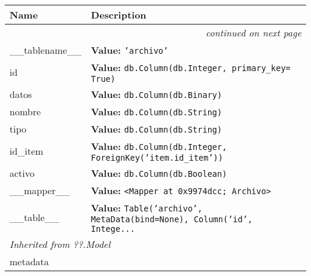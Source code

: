     \vspace{-1cm}
\hspace{\varindent}\begin{longtable}{|p{\varnamewidth}|p{\vardescrwidth}|l}
\cline{1-2}
\cline{1-2} \centering \textbf{Name} & \centering \textbf{Description}& \\
\cline{1-2}
\endhead\cline{1-2}\multicolumn{3}{r}{\small\textit{continued on next page}}\\\endfoot\cline{1-2}
\endlastfoot\raggedright \_\-\_\-t\-a\-b\-l\-e\-n\-a\-m\-e\-\_\-\_\- & \raggedright \textbf{Value:} 
{\tt \texttt{'}\texttt{archivo}\texttt{'}}&\\
\cline{1-2}
\raggedright i\-d\- & \raggedright \textbf{Value:} 
{\tt db.Column(db.Integer, primary\_key= True)}&\\
\cline{1-2}
\raggedright d\-a\-t\-o\-s\- & \raggedright \textbf{Value:} 
{\tt db.Column(db.Binary)}&\\
\cline{1-2}
\raggedright n\-o\-m\-b\-r\-e\- & \raggedright \textbf{Value:} 
{\tt db.Column(db.String)}&\\
\cline{1-2}
\raggedright t\-i\-p\-o\- & \raggedright \textbf{Value:} 
{\tt db.Column(db.String)}&\\
\cline{1-2}
\raggedright i\-d\-\_\-i\-t\-e\-m\- & \raggedright \textbf{Value:} 
{\tt db.Column(db.Integer, ForeignKey('item.id\_item'))}&\\
\cline{1-2}
\raggedright a\-c\-t\-i\-v\-o\- & \raggedright \textbf{Value:} 
{\tt db.Column(db.Boolean)}&\\
\cline{1-2}
\raggedright \_\-\_\-m\-a\-p\-p\-e\-r\-\_\-\_\- & \raggedright \textbf{Value:} 
{\tt {\textless}Mapper at 0x9974dcc; Archivo{\textgreater}}&\\
\cline{1-2}
\raggedright \_\-\_\-t\-a\-b\-l\-e\-\_\-\_\- & \raggedright \textbf{Value:} 
{\tt Table('archivo', MetaData(bind=None), Column('id', Intege\texttt{...}}&\\
\cline{1-2}
\multicolumn{2}{|l|}{\textit{Inherited from ??.Model}}\\
\multicolumn{2}{|p{\varwidth}|}{\raggedright metadata}\\
\cline{1-2}
\end{longtable}

